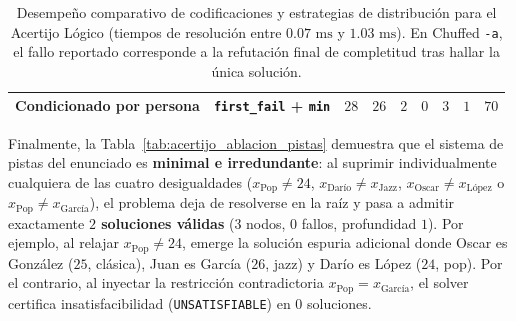 \begin{table}[htbp]
\begin{tabular}{llrrrrrrr}
        Condicionado por persona         & \texttt{first\_fail} + \texttt{min}  & $28$ & $26$ & $2$ & $0$ & $3$ & $1$ & $70$ \\
        \bottomrule
    \end{tabular}
    \caption{Desempeño comparativo de codificaciones y estrategias de distribución para el Acertijo Lógico (tiempos de resolución entre $0.07\text{ ms}$ y $1.03\text{ ms}$). En Chuffed \texttt{-a}, el fallo reportado corresponde a la refutación final de completitud tras hallar la única solución.}
    \label{tab:acertijo_estrategias}
\end{table}

Finalmente, la Tabla~\ref{tab:acertijo_ablacion_pistas} demuestra que el sistema de pistas del enunciado es \textbf{minimal e irredundante}: al suprimir individualmente cualquiera de las cuatro desigualdades ($x_{\text{Pop}} \neq 24$, $x_{\text{Darío}} \neq x_{\text{Jazz}}$, $x_{\text{Oscar}} \neq x_{\text{López}}$ o $x_{\text{Pop}} \neq x_{\text{García}}$), el problema deja de resolverse en la raíz y pasa a admitir exactamente \textbf{$2$ soluciones válidas} ($3$ nodos, $0$ fallos, profundidad $1$). Por ejemplo, al relajar $x_{\text{Pop}} \neq 24$, emerge la solución espuria adicional donde Oscar es González ($25$, clásica), Juan es García ($26$, jazz) y Darío es López ($24$, pop). Por el contrario, al inyectar la restricción contradictoria $x_{\text{Pop}} = x_{\text{García}}$, el solver certifica insatisfacibilidad (\texttt{UNSATISFIABLE}) en $0$ soluciones.

